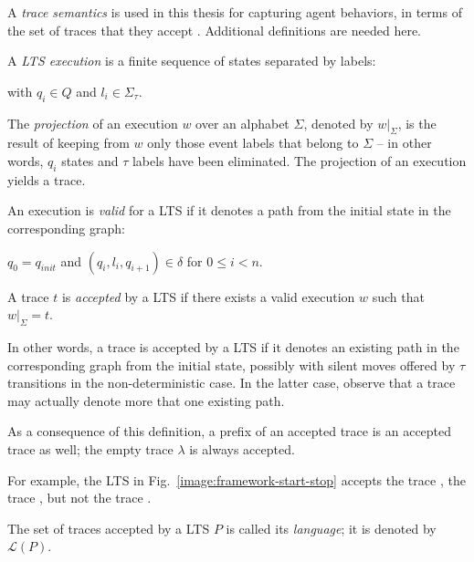 A \emph{trace semantics} is used in this thesis for capturing agent behaviors, in terms of the set of traces that they accept \cite{Hoare:1985}. Additional definitions are needed here. 

\begin{definition}
A \emph{LTS execution} is a finite sequence of states separated by labels:
\begin{center}
\end{center}
\noindent with $q_i \in Q$ and $l_i \in \Sigma_{\tau}$. 
\end{definition}

The \emph{projection} of an execution $w$ over an alphabet $\Sigma$, denoted by $w|_{\Sigma}$, is the result of keeping from $w$ only those event labels that belong to $\Sigma$ -- in other words, $q_i$ states and $\tau$ labels have been eliminated. The projection of an execution yields a trace. 

\begin{definition}
An execution is \emph{valid} for a LTS if it denotes a path from the initial state in the corresponding graph:
\begin{center}
$q_0 = q_{init}$ and $(q_i,l_i,q_{i+1}) \in \delta$ for $0 \leq i < n$. 
\end{center}
\end{definition}

\begin{definition}
A trace $t$ is \emph{accepted} by a LTS if there exists a valid execution $w$ such that $w|_{\Sigma} = t$. 
\end{definition}

In other words, a trace is accepted by a LTS if it denotes an existing path in the corresponding graph from the initial state, possibly with silent moves offered by $\tau$ transitions in the non-deterministic case. In the latter case, observe that a trace may actually denote more that one existing path. 

As a consequence of this definition, a prefix of an accepted trace is an accepted trace as well; the empty trace $\lambda$ is always accepted. 

For example, the LTS in Fig.~\ref{image:framework-start-stop} accepts the trace , the trace , but not the trace . 

\begin{definition}
The set of traces accepted by a LTS $P$ is called its \emph{language}; it is denoted by $\mathcal{L}(P)$.
\end{definition}

